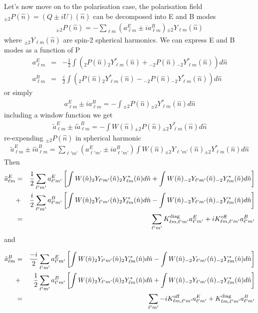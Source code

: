 \documentclass[a4paper, 11pt]{article}
\def\ba{\begin{eqnarray}}
\def\ea{\end{eqnarray}}
\begin{document}
Let's now move on to the polarisation case, the polarisation field ${}_{\pm 2} P(\hat{n})= (Q \pm iU)(\hat{n})$ can be decomposed into E and B modes
\ba
{}_{\pm 2} P(\hat{n}) = - \sum_{\ell m} (a^{E}_{\ell m} \pm i a^{B}_{\ell m}) {}_{\pm 2} Y_{\ell m} (\hat{n})
\ea
where ${}_{\pm 2} Y_{\ell m} (\hat{n})$ are spin-2 spherical harmonics.
We can express E and B modes as a function of P
 \ba
 a^{E}_{\ell m}&=& -\frac{1}{2}  \int \left(  {}_{2} P(\hat{n})  {}_{2} Y^{*}_{\ell m} (\hat{n})+  {}_{-2} P(\hat{n})  {}_{-2} Y^{*}_{\ell m} (\hat{n}) \right) d\hat{n} \\
 a^{B}_{\ell m}&=& \frac{i}{2}  \int \left(  {}_{2} P(\hat{n})  {}_{2} Y^{*}_{\ell m} (\hat{n})-  {}_{-2} P(\hat{n})  {}_{-2} Y^{*}_{\ell m} (\hat{n}) \right) d\hat{n}
 \ea
 or simply
 \ba
  a^{E}_{\ell m} \pm i a^{B}_{\ell m} = - \int {}_{\pm 2} P(\hat{n}) {}_{\pm 2} Y^{*}_{\ell m} (\hat{n})d\hat{n}
 \ea
including a window function we get
 \ba
  \tilde{a}^{E}_{\ell m} \pm i \tilde{a}^{B}_{\ell m} = - \int W(\hat{n}) {}_{\pm 2} P(\hat{n}) {}_{\pm 2} Y^{*}_{\ell m} (\hat{n})d\hat{n}
 \ea
 re-expending ${}_{\pm 2} P(\hat{n})$ in spherical harmonic
 \ba
   \tilde{a}^{E}_{\ell m} \pm i   \tilde{a}^{B}_{\ell m} =  \sum_{\ell' m'} (a^{E}_{\ell' m'} \pm i a^{B}_{\ell' m'}) \int W(\hat{n}) {}_{\pm 2} Y_{\ell' m'} (\hat{n})  {}_{\pm 2} Y^{*}_{\ell m} (\hat{n})d\hat{n}
 \ea
Then
\ba
   \tilde{a}^{E}_{\ell m} &= & \frac{1}{2} \sum_{\ell' m'} a^{E}_{\ell' m'} \left[ \int W(\hat{n}) {}_{ 2} Y_{\ell' m'} (\hat{n})  {}_{ 2} Y^{*}_{\ell m} (\hat{n})d\hat{n} + \int W(\hat{n}) {}_{ -2} Y_{\ell' m'} (\hat{n})  {}_{ -2} Y^{*}_{\ell m} (\hat{n})d\hat{n} \right] \\
 &+& \frac{i}{2} \sum_{\ell' m'}  a^{B}_{\ell' m'} \left[ \int W(\hat{n}) {}_{ 2} Y_{\ell' m'} (\hat{n})  {}_{ 2} Y^{*}_{\ell m} (\hat{n})d\hat{n} -\int W(\hat{n}) {}_{ -2} Y_{\ell' m'} (\hat{n})  {}_{ -2} Y^{*}_{\ell m} (\hat{n})d\hat{n}\right] \\ 
 &=&  \sum_{\ell' m'} K^{\rm diag}_{\ell m, \ell' m'} a^{E}_{\ell' m'} + i K^{\rm off}_{\ell m, \ell' m'} a^{B}_{\ell' m'}
\ea
and 

\ba
   \tilde{a}^{B}_{\ell m} &= & \frac{-i}{2} \sum_{\ell' m'} a^{E}_{\ell' m'} \left[ \int W(\hat{n}) {}_{ 2} Y_{\ell' m'} (\hat{n})  {}_{ 2} Y^{*}_{\ell m} (\hat{n})d\hat{n} - \int W(\hat{n}) {}_{ -2} Y_{\ell' m'} (\hat{n})  {}_{ -2} Y^{*}_{\ell m} (\hat{n})d\hat{n} \right] \\
 &+& \frac{1}{2} \sum_{\ell' m'}  a^{B}_{\ell' m'} \left[ \int W(\hat{n}) {}_{ 2} Y_{\ell' m'} (\hat{n})  {}_{ 2} Y^{*}_{\ell m} (\hat{n})d\hat{n} +\int W(\hat{n}) {}_{ -2} Y_{\ell' m'} (\hat{n})  {}_{ -2} Y^{*}_{\ell m} (\hat{n})d\hat{n}\right] \\
 &=&  \sum_{\ell' m'} -i K^{\rm off}_{\ell m, \ell' m'} a^{E}_{\ell' m'} + K^{\rm diag}_{\ell m, \ell' m'} a^{B}_{\ell' m'}
\ea
\end{document}
